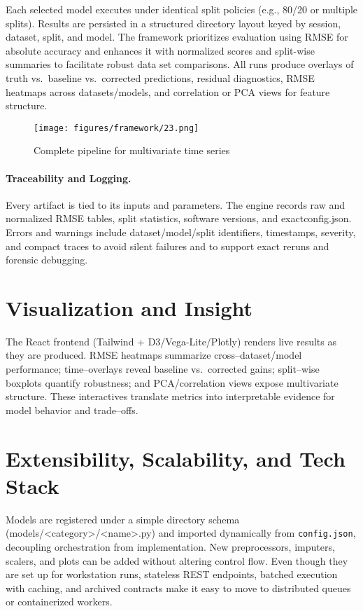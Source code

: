 Each selected model executes under identical split policies (e.g., 80/20 or multiple splits). Results are persisted in a structured directory layout keyed by session, dataset, split, and model. The framework prioritizes evaluation using RMSE for absolute accuracy and enhances it with normalized scores and split-wise summaries to facilitate robust data set comparisons. All runs produce overlays of truth vs.\ baseline vs.\ corrected predictions, residual diagnostics, RMSE heatmaps across datasets/models, and correlation or PCA views for feature structure.

\begin{figure}[htbp]
 \centering
 \texttt{[image: figures/framework/23.png]}
 \caption[Complete pipeline for multivariate time series]{Complete pipeline for multivariate time series}
 \label{fig:ml_pipeline_ts}
\end{figure}

\paragraph{Traceability and Logging.}
Every artifact is tied to its inputs and parameters. The engine records raw and normalized RMSE tables, split statistics, software versions, and exactconfig.json. Errors and warnings include dataset/model/split identifiers, timestamps, severity, and compact traces to avoid silent failures and to support exact reruns and forensic debugging.



\section{Visualization and Insight}
The React frontend (Tailwind + D3/Vega-Lite/Plotly) renders live results as they are produced. RMSE heatmaps summarize cross–dataset/model performance; time–overlays reveal baseline vs.\ corrected gains; split–wise boxplots quantify robustness; and PCA/correlation views expose multivariate structure. These interactives translate metrics into interpretable evidence for model behavior and trade–offs.


\section{Extensibility, Scalability, and Tech Stack}
Models are registered under a simple directory schema (models/<category>/<name>.py) and imported dynamically from \texttt{config.json}, decoupling orchestration from implementation. New preprocessors, imputers, scalers, and plots can be added without altering control flow. Even though they are set up for workstation runs, stateless REST endpoints, batched execution with caching, and archived contracts make it easy to move to distributed queues or containerized workers.

